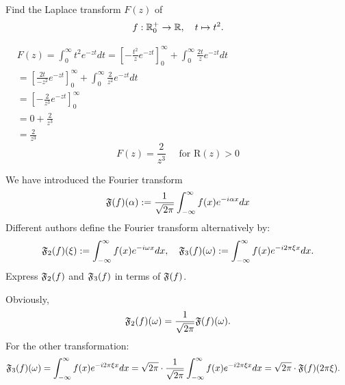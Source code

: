 \documentclass[11pt]{article}
\begin{document}
\begin{exercise}
    Find the Laplace transform $F(z)$ of 
    \begin{align*}
        f : \mathbb{R}_{0}^{+} \to \mathbb{R}, \quad t \mapsto t^{2}.
    \end{align*}
\end{exercise}
\begin{solution}     
$\begin{aligned} & F(z)=\int_0^{\infty} t^2 e^{-z t} d t=\left[-\frac{t^2}{z} e^{-z t}\right]_0^{\infty}+\int_0^{\infty} \frac{2 t}{z} e^{-z t} d t \\ &=\left[\frac{2 t}{-z^2} e^{-z t}\right]_0^{\infty}+\int_0^{\infty} \frac{2}{z^2} e^{-z t} d t \\ &=\left[-\frac{2}{z^3} e^{-z t}\right]_0^{\infty} \\ &=0+\frac{2}{z^3} \\ &=\frac{2}{z^3}\end{aligned}$
$$
F(z)=\frac{2}{z^3} \quad \text { for } \mathrm{R}(z)>0
$$
\end{solution}

\begin{exercise}[Extra]
    We have introduced the Fourier transform 
    \begin{align*}
        \mathfrak{F}(f)(\alpha) := \frac{1}{\sqrt{2\pi}}\int_{-\infty}^{\infty} f(x) e^{-i \alpha x} dx
    \end{align*}
    Different authors define the Fourier transform alternatively by:
    \begin{align*}
        \mathfrak{F}_2(f)(\xi) 
        := \int_{-\infty}^{\infty} f(x) e^{-i \omega x} dx
        ,
        \quad 
        \mathfrak{F}_3(f)(\omega) 
        := \int_{-\infty}^{\infty} f(x) e^{-i 2\pi \xi x} dx
        .
    \end{align*}
    Express $\mathfrak{F}_{2}(f)$ and $\mathfrak{F}_{3}(f)$ in terms of $\mathfrak{F}(f)$.
\end{exercise}
\begin{solution}    
    Obviously, 
    \begin{align*}
        \mathfrak{F}_{2}(f)(\omega) = \frac{1}{\sqrt{2\pi}} \mathfrak{F}(f)(\omega).
    \end{align*}
    For the other transformation:
    \begin{align*}
        \mathfrak{F}_3(f)(\omega) 
        &
        = 
        \int_{-\infty}^{\infty} f(x) e^{-i 2\pi \xi x} dx
        = 
        \sqrt{2\pi} 
        \cdot 
        \frac{1}{\sqrt{2\pi}}
        \int_{-\infty}^{\infty} f(x) e^{-i 2\pi \xi x} dx
        = 
        \sqrt{2\pi} 
        \cdot 
        \mathfrak{F}(f)( 2\pi \xi )
        .
    \end{align*}
\end{solution}
\end{document}
